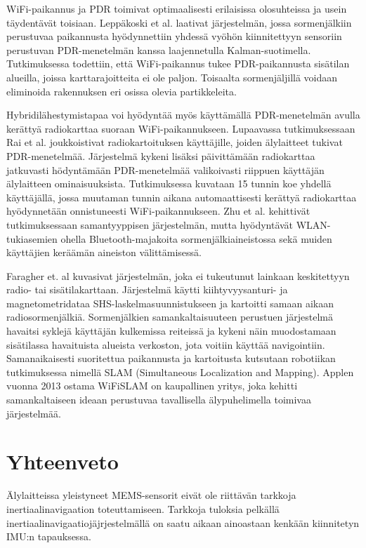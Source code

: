 WiFi-paikannus ja PDR toimivat optimaalisesti erilaisissa olosuhteissa
ja usein täydentävät toisiaan.
Leppäkoski et al. \cite{leppakoski2013} laativat
järjestelmän, jossa
sormenjälkiin perustuvaa paikannusta hyödynnettiin yhdessä 
vyöhön kiinnitettyyn sensoriin perustuvan PDR-menetelmän
kanssa laajennetulla Kalman-suotimella. Tutkimuksessa todettiin,
että WiFi-paikannus tukee PDR-paikannusta sisätilan alueilla, joissa
karttarajoitteita ei ole paljon. Toisaalta sormenjäljillä voidaan
eliminoida rakennuksen eri osissa olevia partikkeleita.

Hybridilähestymistapaa voi hyödyntää myös käyttämällä PDR-menetelmän avulla
kerättyä radiokarttaa suoraan WiFi-paikannukseen. Lupaavassa
tutkimuksessaan Rai et al. \cite{rai2012} joukkoistivat radiokartoituksen
käyttäjille, joiden älylaitteet tukivat PDR-menetelmää. Järjestelmä
kykeni lisäksi päivittämään radiokarttaa jatkuvasti hödyntämään PDR-menetelmää
valikoivasti riippuen käyttäjän älylaitteen ominaisuuksista. Tutkimuksessa
kuvataan 15 tunnin koe yhdellä käyttäjällä, jossa muutaman tunnin aikana
automaattisesti kerättyä radiokarttaa hyödynnetään onnistuneesti
WiFi-paikannukseen. Zhu et al. \cite{zhu2012} kehittivät tutkimuksessaan
samantyyppisen järjestelmän, mutta hyödyntävät WLAN-tukiasemien ohella
Bluetooth-majakoita sormenjälkiaineistossa sekä muiden käyttäjien
keräämän aineiston välittämisessä.

Faragher et. al \cite{faragher2012} kuvasivat järjestelmän, joka ei
tukeutunut lainkaan keskitettyyn radio- tai sisätilakarttaan. Järjestelmä
käytti kiihtyvyysanturi- ja magnetometridataa SHS-laskelmasuunnistukseen ja
kartoitti samaan aikaan radiosormenjälkiä. Sormenjälkien samankaltaisuuteen
perustuen järjestelmä havaitsi syklejä käyttäjän kulkemissa reiteissä
ja kykeni näin muodostamaan sisätilassa havaituista alueista
verkoston, jota voitiin käyttää navigointiin. Samanaikaisesti
suoritettua paikannusta ja kartoitusta kutsutaan robotiikan tutkimuksessa
nimellä SLAM (Simultaneous Localization and Mapping).
Applen vuonna 2013 ostama WiFiSLAM on kaupallinen yritys, joka kehitti
samankaltaiseen ideaan perustuvaa tavallisella älypuhelimella toimivaa
järjestelmää.

\section{Yhteenveto}

Älylaitteissa yleistyneet MEMS-sensorit eivät ole riittävän tarkkoja
inertiaalinavigaation toteuttamiseen. Tarkkoja tuloksia
pelkällä inertiaalinavigaatiojäjrjestelmällä
on saatu aikaan
ainoastaan kenkään kiinnitetyn IMU:n tapauksessa.

